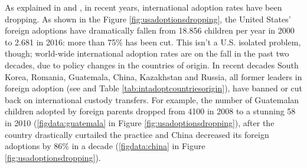 As explained in \cite{adoptdropping_article} and \cite{adoptdropping_book}, in recent years, international adoption rates have been dropping. As shown in the Figure \ref{fig:usadoptionsdropping}, the United States' foreign adoptions have dramatically fallen from 18.856 children per year in 2000 to 2.681 in 2016: more than 75\% has been cut. This isn't a U.S. isolated problem, though; world-wide international adoption rates are on the fall in the past two decades, due to policy changes in the countries of origin. In recent decades South Korea, Romania, Guatemala, China, Kazakhstan and Russia, all former leaders in foreign adoption (see \cite{unreport} and Table \ref{tab:intadoptcountriesorigin}), have banned or cut back on international custody transfers. For example, the number of Guatemalan children adopted by foreign parents dropped from 4100 in 2008 to a stunning 58 in 2010 (\ref{figdata:guatemala} in Figure \ref{fig:usadoptionsdropping}), after the country drastically curtailed the practice and China decreased its foreign adoptions by 86\% in a decade (\ref{figdata:china} in Figure \ref{fig:usadoptionsdropping}).

